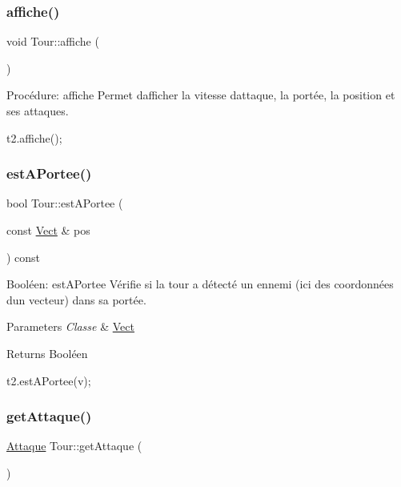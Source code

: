 \subsubsection{\texorpdfstring{affiche()}{affiche()}}
{\footnotesize\ttfamily void Tour\+::affiche (\begin{DoxyParamCaption}{ }\end{DoxyParamCaption})}



Procédure\+: affiche Permet d\textquotesingle{}afficher la vitesse d\textquotesingle{}attaque, la portée, la position et ses attaques. 


\begin{DoxyCode}
t2.affiche();
\end{DoxyCode}
 \mbox{\label{classTour_ad9f4d42370374f373f48f7d0fb36559a}} 
\subsubsection{\texorpdfstring{est\+A\+Portee()}{estAPortee()}}
{\footnotesize\ttfamily bool Tour\+::est\+A\+Portee (\begin{DoxyParamCaption}\item[{const \hyperlink{classVect}{Vect} \&}]{pos }\end{DoxyParamCaption}) const}



Booléen\+: est\+A\+Portee Vérifie si la tour a détecté un ennemi (ici des coordonnées d\textquotesingle{}un vecteur) dans sa portée. 


\begin{DoxyParams}{Parameters}
{\em Classe} & \hyperlink{classVect}{Vect} \\
\hline
\end{DoxyParams}
\begin{DoxyReturn}{Returns}
Booléen 
\begin{DoxyCode}
t2.estAPortee(v);
\end{DoxyCode}
 
\end{DoxyReturn}
\mbox{\label{classTour_a647b54e61e3ee195a5e830b3cd677197}} 
\subsubsection{\texorpdfstring{get\+Attaque()}{getAttaque()}}
{\footnotesize\ttfamily \hyperlink{classAttaque}{Attaque} Tour\+::get\+Attaque (\begin{DoxyParamCaption}{ }\end{DoxyParamCaption})}



